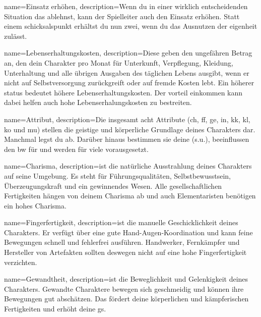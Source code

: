 {
    name={Einsatz erhöhen},
    description={Wenn du in einer wirklich entscheidenden Situation das  ablehnst, kann der Spielleiter auch den Einsatz erhöhen. Statt einem \gls{schicksalspunkt} erhältst du nun zwei, wenn du das Ausnutzen der \gls{eigenheit} zulässt.}}

{
    name={Lebenserhaltungskosten},
    description={Diese geben den ungefähren Betrag an, den dein Charakter pro Monat für Unterkunft, Verpflegung, Kleidung, Unterhaltung und alle übrigen Ausgaben des täglichen Lebens ausgibt, wenn er nicht auf Selbstversorgung zurückgreift oder auf fremde Kosten lebt. Ein höherer \gls{status} bedeutet höhere Lebenserhaltungskosten. Der \gls{vorteil} \gls{einkommen} kann dabei helfen auch hohe Lebenserhalungskosten zu bestreiten.}}

{
    name={Attribut},
    description={Die insgesamt acht Attribute (\gls{ch}, \gls{ff}, \gls{ge}, \gls{in}, \gls{kk}, \gls{kl}, \gls{ko} und \gls{mu}) stellen die geistige und körperliche Grundlage deines Charakters dar. Manchmal legst du  ab. Darüber hinaus bestimmen sie deine  (s.u.), beeinflussen den \gls{bw} für  und werden für viele  vorausgesetzt.}}

{
    name={Charisma},
    description={ist die natürliche Ausstrahlung deines Charakters auf seine Umgebung. Es steht für Führungsqualitäten, Selbstbewusstsein, Überzeugungskraft und ein gewinnendes Wesen. Alle gesellschaftlichen Fertigkeiten hängen von deinem Charisma ab und auch Elementaristen benötigen ein hohes Charisma.}}

{
    name={Fingerfertigkeit},
    description={ist die manuelle Geschicklichkeit deines Charakters. Er verfügt über eine gute Hand-Augen-Koordination und kann feine Bewegungen schnell und fehlerfrei ausführen. Handwerker, Fernkämpfer und Hersteller von Artefakten sollten deswegen nicht auf eine hohe Fingerfertigkeit verzichten.}}

{
    name={Gewandtheit},
    description={ist die Beweglichkeit und Gelenkigkeit deines Charakters. Gewandte Charaktere bewegen sich geschmeidig und können ihre Bewegungen gut abschätzen. Das fördert deine körperlichen und kämpferischen Fertigkeiten und erhöht deine \gls{gs}.}}

